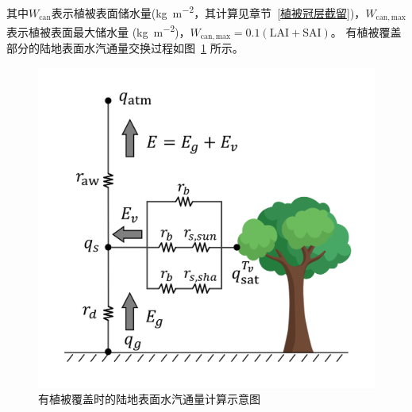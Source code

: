 其中$W_{\mathrm{can}}$表示植被表面储水量(\unit{kg.m^{-2}}，其计算见章节~\ref{植被冠层截留})，$W_{\mathrm{can,max}}$表示植被表面最大储水量
(\unit{kg.m^{-2}})，$W_{\mathrm{can,max}}=0.1\left(\text {LAI}+ \text {SAI}\right)$。
有植被覆盖部分的陆地表面水汽通量交换过程如图~\ref{fig:有植被覆盖部分的陆地表面水汽通量示意图} 所示。
{
  \begin{figure}[htbp]
    \centering
    \includegraphics[width=0.6\linewidth]{Figures/地表湍流交换过程/有植被潜热交换阻抗示意图.png}
    \caption{有植被覆盖时的陆地表面水汽通量计算示意图}
    \label{fig:有植被覆盖部分的陆地表面水汽通量示意图}
  \end{figure}
}

